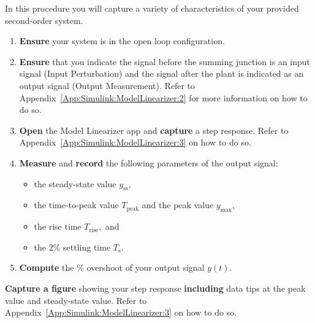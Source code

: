 \begin{procedure}[label={proc:lab2:p1}]
  In this procedure you will capture a variety of characteristics of
  your provided second-order system.
  \begin{enumerate}[label=(\arabic*)]
    \item{
      \textbf{Ensure} your system is in the open loop configuration.
    }
    \item{
      \textbf{Ensure} that you indicate the signal before the summing junction
      is an input signal (Input Perturbation) and the signal after the plant
      is indicated as an output signal (Output Measurement). Refer
      to Appendix~\ref{App:Simulink:ModelLinearizer:2} for more information
      on how to do so.
    }
    \item{
      \textbf{Open} the Model Linearizer app and \textbf{capture} a
      step response. Refer to Appendix~\ref{App:Simulink:ModelLinearizer:3}
      on how to do so.
    }
    \item{
      \textbf{Measure} and \textbf{record} the following parameters of the
      output signal:
      \begin{itemize}
        \item{
          the steady-state value \(y_{\mathrm{ss}},\)
        }
        \item{
          the time-to-peak value \(T_{\mathrm{peak}}\) and
          the peak value \(y_{\mathrm{max}},\)
        }
        \item{
          the rise time \(T_{\mathrm{rise}},\) and
        }
        \item{
          the \(2\%\) settling time \(T_{\mathrm{s}}.\)
        }
      \end{itemize}
    }
    \item{
      \textbf{Compute} the \(\%\) overshoot of your output signal \(y(t).\)
    }
  \end{enumerate}
\end{procedure}
%
\begin{deliverable}[label={lab2:d1}]
  \textbf{Capture a figure} showing your step response \textbf{including}
  data tips at the peak value and steady-state value. Refer to
  Appendix~\ref{App:Simulink:ModelLinearizer:3} on how to do so.
\end{deliverable}

